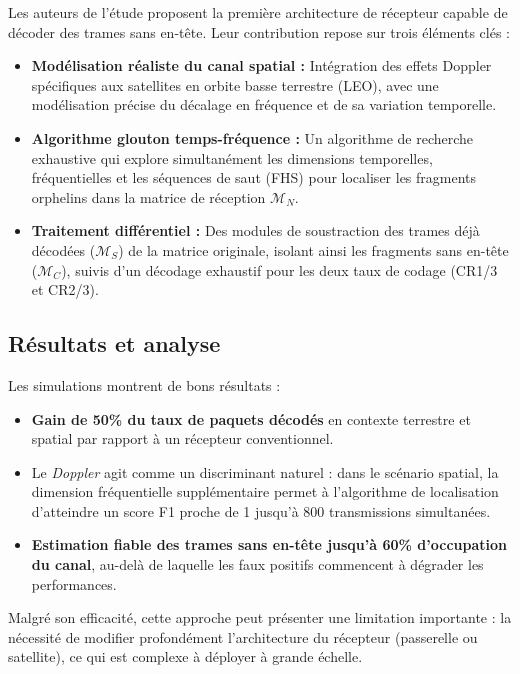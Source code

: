 Les auteurs de l'étude \cite{maldonado2025headerless} proposent la première architecture de récepteur capable de décoder des trames sans en-tête. Leur contribution repose sur trois éléments clés :

\begin{itemize}
	\item \textbf{Modélisation réaliste du canal spatial :} Intégration des effets Doppler spécifiques aux satellites en orbite basse terrestre (LEO), avec une modélisation précise du décalage en fréquence et de sa variation temporelle.
	
	\item \textbf{Algorithme glouton temps-fréquence :} Un algorithme de recherche exhaustive qui explore simultanément les dimensions temporelles, fréquentielles et les séquences de saut (FHS) pour localiser les fragments orphelins dans la matrice de réception $\mathcal{M}_N$.
	
	\item \textbf{Traitement différentiel :} Des modules de soustraction des trames déjà décodées ($\mathcal{M}_S$) de la matrice originale, isolant ainsi les fragments sans en-tête ($\mathcal{M}_C$), suivis d'un décodage exhaustif pour les deux taux de codage (CR1/3 et CR2/3).
\end{itemize}

\subsection{Résultats et analyse}

Les simulations montrent de bons résultats :

\begin{itemize}
	\item \textbf{Gain de 50\% du taux de paquets décodés} en contexte terrestre et spatial par rapport à un récepteur conventionnel.
	\item Le \textit{Doppler} agit comme un discriminant naturel : dans le scénario spatial, la dimension fréquentielle supplémentaire permet à l'algorithme de localisation d'atteindre un score F1 proche de 1 jusqu'à 800 transmissions simultanées.
	\item \textbf{Estimation fiable des trames sans en-tête jusqu'à 60\% d'occupation du canal}, au-delà de laquelle les faux positifs commencent à dégrader les performances.
\end{itemize}


Malgré son efficacité, cette approche peut présenter une limitation importante : la nécessité de modifier profondément l'architecture du récepteur (passerelle ou satellite), ce qui est complexe à déployer à grande échelle.

